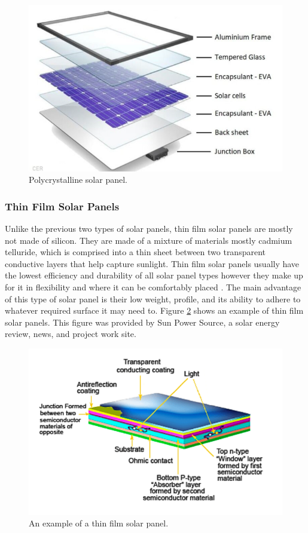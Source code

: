 \begin{figure}
    \centering
    \includegraphics[scale=0.4]{figures/polycrystaline solar.png}
    \caption{Polycrystalline solar panel.}
    \label{fig:poly-sp} 
\end{figure}
\subsubsection{Thin Film Solar Panels}

Unlike the previous two types of solar panels, thin film solar panels are mostly not made of silicon. They are made of a mixture of materials mostly cadmium telluride, which is comprised into a thin sheet between two transparent conductive layers that help capture sunlight. Thin film solar panels usually have the lowest efficiency and durability of all solar panel types however they make up for it in flexibility and where it can be comfortably placed . The main advantage of this type of solar panel is their low weight, profile, and its ability to adhere to whatever required surface it may need to. Figure \ref{fig:thin-film-sp} shows an example of thin film solar panels. This figure was provided by Sun Power Source, a solar energy review, news, and project work site.
\begin{figure}
    \centering
    \includegraphics[scale=0.4]{figures/thin film solar.png}
    \caption{An example of a thin film solar panel.}
    \label{fig:thin-film-sp} 
\end{figure}


